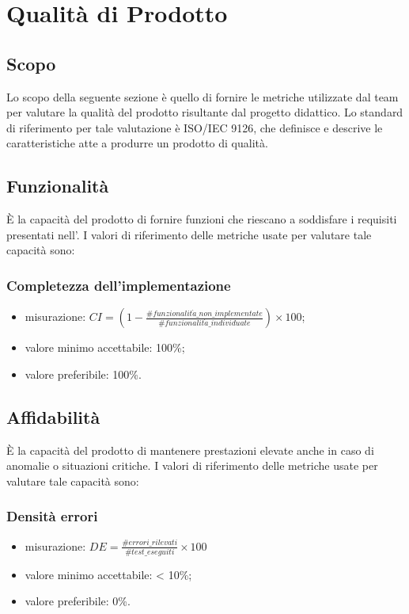\section{Qualità di Prodotto}
\subsection{Scopo}
Lo scopo della seguente sezione è quello di fornire le metriche utilizzate dal team \Gruppo{} per valutare la qualità del prodotto risultante dal progetto didattico. Lo standard di riferimento per tale valutazione è ISO/IEC 9126, che definisce e descrive le caratteristiche atte a produrre un prodotto di qualità.

\subsection{Funzionalità}
È la capacità del prodotto di fornire funzioni che riescano a soddisfare i requisiti presentati nell'\textit{\AdR}.
I valori di riferimento delle metriche usate per valutare tale capacità sono:

	\subsubsection*{Completezza dell'implementazione}
	\begin{itemize}
	\item{misurazione: $CI = (1- \displaystyle\frac{\#funzionalit\grave{a}\_non\_implementate}{\#funzionalit\grave{a}\_individuate})\times100$};
	\item {valore minimo accettabile: 100\%;}
	\item {valore preferibile: 100\%.}
	\end{itemize}
	
\subsection{Affidabilità}
È la capacità del prodotto di mantenere prestazioni elevate anche in caso di anomalie o situazioni critiche.
I valori di riferimento delle metriche usate per valutare tale capacità sono:

	\subsubsection*{Densità errori}
	\begin{itemize}
		\item{misurazione: $DE = \displaystyle\frac{\#errori\_rilevati}{\#test\_eseguiti}\times100$}
		\item {valore minimo accettabile: < 10\%;}
		\item {valore preferibile: 0\%.}
	\end{itemize}


